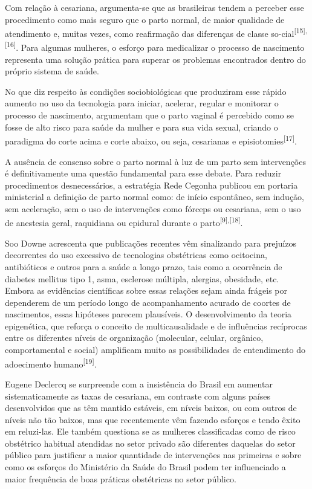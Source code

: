 \documentclass{article}
\begin{document}
Com relação à cesariana, argumenta-se que as brasileiras tendem a perceber esse
procedimento como mais seguro que o parto normal, de maior qualidade de
atendimento e,
muitas vezes, como reafirmação das diferenças de classe so-cial\textsuperscript{[}\textsuperscript{15}\textsuperscript{]}\textsuperscript{,}\textsuperscript{[}\textsuperscript{16}\textsuperscript{]}. Para algumas mulheres, o esforço para medicalizar o
processo de nascimento representa uma solução prática para superar os problemas
encontrados dentro do próprio sistema de saúde.

No que diz respeito às condições sociobiológicas que produziram esse rápido
aumento no
uso da tecnologia para iniciar, acelerar, regular e monitorar o processo de
nascimento,
argumentam que o parto vaginal é percebido como se fosse de alto risco para
saúde da
mulher e para sua vida sexual, criando o paradigma do corte acima e corte
abaixo, ou
seja, cesarianas e episiotomies\textsuperscript{[}\textsuperscript{17}\textsuperscript{]}.

A ausência de consenso sobre o parto normal à luz de um parto sem intervenções é
definitivamente uma questão fundamental para esse debate. Para reduzir
procedimentos
desnecessários, a estratégia Rede Cegonha publicou em portaria ministerial a
definição
de parto normal como: de início espontâneo, sem indução, sem aceleração, sem o
uso de
intervenções como fórceps ou cesariana, sem o uso de anestesia geral, raquidiana
ou
epidural durante o parto\textsuperscript{[}\textsuperscript{9}\textsuperscript{]}\textsuperscript{,}\textsuperscript{[}\textsuperscript{18}\textsuperscript{]}.

Soo Downe acrescenta que publicações recentes vêm sinalizando para prejuízos
decorrentes
do uso excessivo de tecnologias obstétricas como ocitocina, antibióticos e
outros para a
saúde a longo prazo, tais como a ocorrência de diabetes mellitus tipo 1, asma,
esclerose
múltipla, alergias, obesidade, etc. Embora as evidências científicas sobre essas
relações sejam ainda frágeis por dependerem de um período longo de
acompanhamento
acurado de coortes de nascimentos, essas hipóteses parecem plausíveis. O
desenvolvimento
da teoria epigenética, que reforça o conceito de multicausalidade e de
influências
recíprocas entre os diferentes níveis de organização (molecular, celular,
orgânico,
comportamental e social) amplificam muito as possibilidades de entendimento do
adoecimento humano\textsuperscript{[}\textsuperscript{19}\textsuperscript{]}.

Eugene Declercq se surpreende com a insistência do Brasil em aumentar
sistematicamente as
taxas de cesariana, em contraste com alguns países desenvolvidos que as têm
mantido
estáveis, em níveis baixos, ou com outros de níveis não tão baixos, mas que
recentemente
vêm fazendo esforços e tendo êxito em reluzi-las. Ele também questiona se as
mulheres
classificadas como de risco obstétrico habitual atendidas no setor privado são
diferentes daquelas do setor público para justificar a maior quantidade de
intervenções
nas primeiras e sobre como os esforços do Ministério da Saúde do Brasil podem
ter
influenciado a maior frequência de boas práticas obstétricas no setor público.
\end{document}
